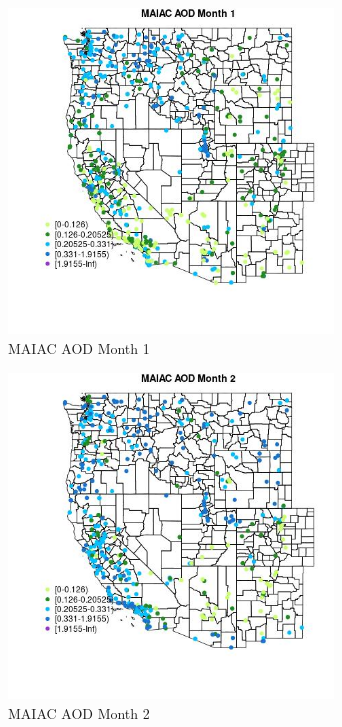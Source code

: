 \begin{figure} 
\centering  
\includegraphics[width=0.77\textwidth]{Code_Outputs/Report_ML_input_PM25_Step4_part_e_de_duplicated_aves_compiled_2019-05-18wNAs_MapObsMo1MAIAC_AOD.jpg} 
\caption{\label{fig:Report_ML_input_PM25_Step4_part_e_de_duplicated_aves_compiled_2019-05-18wNAsMapObsMo1MAIAC_AOD}MAIAC AOD Month 1} 
\end{figure} 
 

\begin{figure} 
\centering  
\includegraphics[width=0.77\textwidth]{Code_Outputs/Report_ML_input_PM25_Step4_part_e_de_duplicated_aves_compiled_2019-05-18wNAs_MapObsMo2MAIAC_AOD.jpg} 
\caption{\label{fig:Report_ML_input_PM25_Step4_part_e_de_duplicated_aves_compiled_2019-05-18wNAsMapObsMo2MAIAC_AOD}MAIAC AOD Month 2} 
\end{figure} 
 

